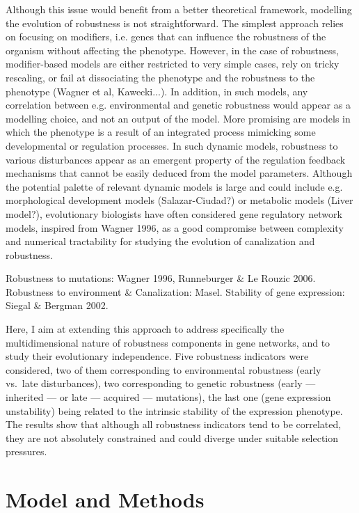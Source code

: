 \documentclass{article}
\begin{document}
Although this issue would benefit from a better theoretical framework, modelling the evolution of robustness is not straightforward. The simplest approach relies on focusing on modifiers, i.e. genes that can influence the robustness of the organism without affecting the phenotype. However, in the case of robustness, modifier-based models are either restricted to very simple cases, rely on tricky rescaling, or fail at dissociating the phenotype and the robustness to the phenotype (Wagner et al, Kawecki...). In addition, in such models, any correlation between e.g. environmental and genetic robustness would appear as a modelling choice, and not an output of the model. More promising are models in which the phenotype is a result of an integrated process mimicking some developmental or regulation processes. In such dynamic models, robustness to various disturbances appear as an emergent property of the regulation feedback mechanisms that cannot be easily deduced from the model parameters. Although the potential palette of relevant dynamic models is large and could include e.g. morphological development models (Salazar-Ciudad?) or metabolic models (Liver model?), evolutionary biologists have often considered gene regulatory network models, inspired from Wagner 1996, as a good compromise between complexity and numerical tractability for studying the evolution of canalization and robustness. 

Robustness to mutations: Wagner 1996, Runneburger \& Le Rouzic 2006. Robustness to environment \& Canalization: Masel. Stability of gene expression: Siegal \& Bergman 2002. 

Here, I aim at extending this approach to address specifically the multidimensional nature of robustness components in gene networks, and to study their evolutionary independence. Five robustness indicators were considered, two of them corresponding to environmental robustness (early vs.\ late disturbances), two corresponding to genetic robustness (early --- inherited --- or late --- acquired --- mutations), the last one (gene expression unstability) being related to the intrinsic stability of the expression phenotype. The results show that although all robustness indicators tend to be correlated, they are not absolutely constrained and could diverge under suitable selection pressures. 

\section{Model and Methods}
\end{document}
